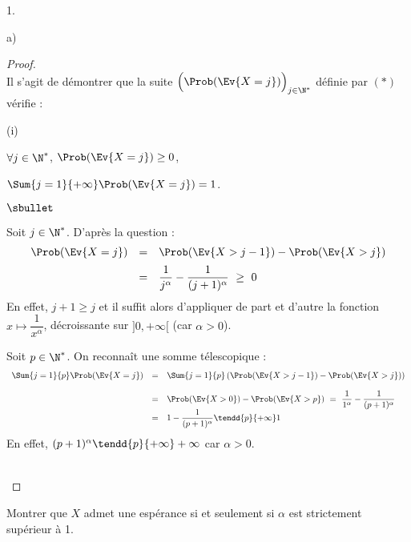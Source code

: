 \begin{noliste}{1.}
\begin{noliste}{a)}
    \begin{proof}~\\%
      Il s'agit de démontrer que la suite $\Big( \Prob(\Ev{X = j})
      \Big)_{j \in \N^*}$ définie par $(\ast)$ vérifie :
      \begin{noliste}{(i)}
      \item $\forall j \in \N^*$, $\Prob(\Ev{X = j}) \geq 0$,
      \item $\Sum{j = 1}{+\infty} \Prob(\Ev{X = j}) = 1$.
      \end{noliste}
      \begin{noliste}{$\sbullet$}
      \item Soit $j \in \N^*$. D'après la question  :
        \[
        \begin{array}{rcl}
          \Prob(\Ev{X = j}) & = & \Prob(\Ev{X > j-1}) - \Prob(\Ev{X >
            j})
          \\[.2cm]
          & = & \dfrac{1}{j^{\alpha}} - \dfrac{1}{(j+1)^{\alpha}} \
          \geq \ 0
        \end{array}
        \]
        En effet, $j + 1 \geq j$ et il suffit alors d'appliquer de
        part et d'autre la fonction $x \mapsto \dfrac{1}{x^\alpha}$,
        décroissante sur $]0, +\infty[$ (car $\alpha > 0$).


        \newpage


      \item Soit $p \in \N^*$. On reconnaît une somme télescopique :
        \[
        \begin{array}{rcl}
          \Sum{j=1}{p} \Prob(\Ev{X = j}) & = & \Sum{j=1}{p}
          \left(\Prob(\Ev{X > j-1}) - \Prob(\Ev{X > j}) \right) 
          \\[.4cm]
          & = & \Prob(\Ev{X > 0}) - \Prob(\Ev{X > p}) \ = \
          \dfrac{1}{1^\alpha} - \dfrac{1}{(p+1)^\alpha} 
          \\[.2cm]
          & = & 1 - \dfrac{1}{(p+1)^\alpha} \tendd{p}{+\infty} 1
        \end{array}
        \]
        En effet, $(p+1)^\alpha \tendd{p}{+\infty} +\infty$ car
        $\alpha > 0$.
      \end{noliste}
      ~\\[-.8cm]
    \end{proof}




  \item Montrer que $X$ admet une espérance si et seulement si $\alpha$ 
    est strictement supérieur à 1.


\end{noliste}
\end{noliste}

